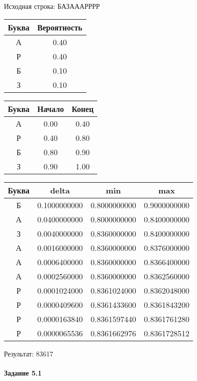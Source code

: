 \documentclass[a4paper, 12pt]{article}
\begin{document}
Исходная строка: БАЗАААРРРР\
\begin{center}
 \begin{tabular}{ |c|c| } 
  \hline
     Буква & Вероятность \\ \hline
А & 0.40\\\hline
Р & 0.40\\\hline
Б & 0.10\\\hline
З & 0.10
\\ \hline \end{tabular}
\end{center}
\begin{center}
 \begin{tabular}{ |c|c|c| } 
  \hline
     Буква & Начало & Конец \\ \hline
А & 0.00 & 0.40\\\hline
Р & 0.40 & 0.80\\\hline
Б & 0.80 & 0.90\\\hline
З & 0.90 & 1.00
\\ \hline \end{tabular}
\end{center}
\begin{center}
 \begin{tabular}{ |c|c|c|c| } 
  \hline
     Буква & delta & min & max \\ \hline
Б & 0.1000000000 & 0.8000000000 & 0.9000000000\\\hline
А & 0.0400000000 & 0.8000000000 & 0.8400000000\\\hline
З & 0.0040000000 & 0.8360000000 & 0.8400000000\\\hline
А & 0.0016000000 & 0.8360000000 & 0.8376000000\\\hline
А & 0.0006400000 & 0.8360000000 & 0.8366400000\\\hline
А & 0.0002560000 & 0.8360000000 & 0.8362560000\\\hline
Р & 0.0001024000 & 0.8361024000 & 0.8362048000\\\hline
Р & 0.0000409600 & 0.8361433600 & 0.8361843200\\\hline
Р & 0.0000163840 & 0.8361597440 & 0.8361761280\\\hline
Р & 0.0000065536 & 0.8361662976 & 0.8361728512
\\ \hline \end{tabular}
\end{center}
Результат: 83617
\pagebreak
\paragraph{Задание 5.1}
\end{document}
